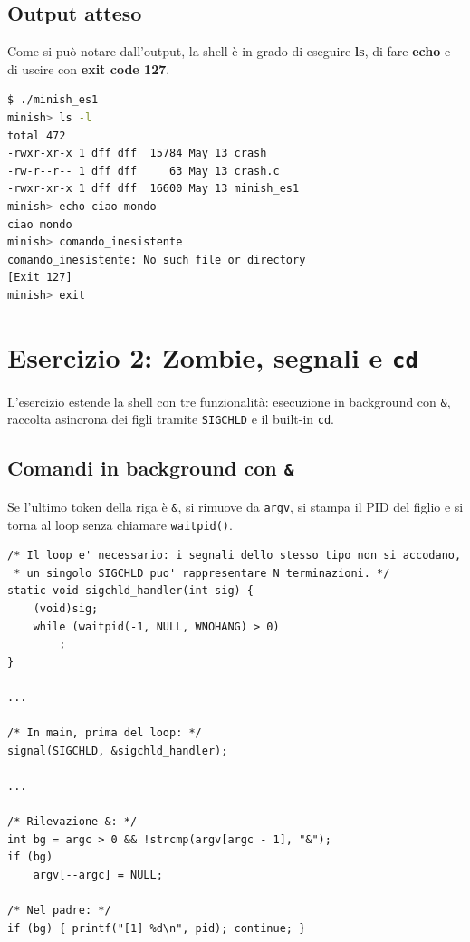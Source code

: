 \documentclass[a4paper,12pt]{article}
\begin{document}
\subsection{Output atteso}
Come si può notare dall'output, la shell è in grado di eseguire \textbf{ls}, di fare
\textbf{echo} e di uscire con \textbf{exit code 127}.

\begin{lstlisting}[language=bash, caption={Test Esercizio 1}]
$ ./minish_es1
minish> ls -l
total 472
-rwxr-xr-x 1 dff dff  15784 May 13 crash
-rw-r--r-- 1 dff dff     63 May 13 crash.c
-rwxr-xr-x 1 dff dff  16600 May 13 minish_es1
minish> echo ciao mondo
ciao mondo
minish> comando_inesistente
comando_inesistente: No such file or directory
[Exit 127]
minish> exit
\end{lstlisting}

\section{Esercizio 2: Zombie, segnali e \texttt{cd}}

L'esercizio estende la shell con tre funzionalità: esecuzione in background
con \texttt{\&}, raccolta asincrona dei figli tramite \texttt{SIGCHLD} e il
built-in \texttt{cd}.

\subsection*{Comandi in background con \texttt{\&}}

Se l'ultimo token della riga è \texttt{\&}, si rimuove da \texttt{argv},
si stampa il PID del figlio e si torna al loop senza chiamare
\texttt{waitpid()}.

\begin{lstlisting}[caption={Rilevazione background e handler SIGCHLD}]
/* Il loop e' necessario: i segnali dello stesso tipo non si accodano,
 * un singolo SIGCHLD puo' rappresentare N terminazioni. */
static void sigchld_handler(int sig) {
    (void)sig;
    while (waitpid(-1, NULL, WNOHANG) > 0)
        ;
}

...

/* In main, prima del loop: */
signal(SIGCHLD, &sigchld_handler);

...

/* Rilevazione &: */
int bg = argc > 0 && !strcmp(argv[argc - 1], "&");
if (bg)
    argv[--argc] = NULL;

/* Nel padre: */
if (bg) { printf("[1] %d\n", pid); continue; }
\end{lstlisting}
\end{document}
